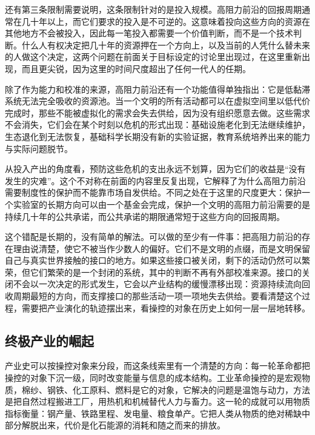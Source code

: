 还有第三条限制需要说明，这条限制针对的是投入规模。高阻力前沿的回报周期通常在几十年以上，而它们要求的投入是不可逆的。这意味着投向这些方向的资源在其他地方不会被投入，因此每一笔投入都需要一个价值判断，而不是一个技术判断。什么人有权决定把几十年的资源押在一个方向上，以及当前的人凭什么替未来的人做这个决定，这两个问题在前面关于目标设定的讨论里出现过，在这里重新出现，而且更尖锐，因为这里的时间尺度超出了任何一代人的任期。


除了作为能力和校准的来源，高阻力前沿还有一个功能值得单独指出：它是低黏滞系统无法完全吸收的资源池。当一个文明的所有活动都可以在虚拟空间里以低代价完成时，那些不能被虚拟化的需求会失去供给，因为没有组织愿意去做。这些需求不会消失，它们会在某个时刻以危机的形式出现：基础设施老化到无法继续维护，生态退化到无法恢复，基础科学长期没有新的实验证据，教育系统培养出来的能力与实际问题脱节。

从投入产出的角度看，预防这些危机的支出永远不划算，因为它们的收益是“没有发生的灾难”。这个不对称在前面的内容里反复出现，它解释了为什么高阻力前沿需要制度性的保护而不能靠市场自发供给。不同之处在于这里的尺度更大：保护一个实验室的长期方向可以由一个基金会完成，保护一个文明的高阻力前沿需要的是持续几十年的公共承诺，而公共承诺的期限通常短于这些方向的回报周期。

这个错配是长期的，没有简单的解法。可以做的至少有一件事：把高阻力前沿的存在理由说清楚，使它不被当作少数人的偏好。它们不是文明的点缀，而是文明保留自己与真实世界接触的接口的地方。如果这些接口被关闭，剩下的活动仍然可以繁荣，但它们繁荣的是一个封闭的系统，其中的判断不再有外部校准来源。接口的关闭不会以一次决定的形式发生，它会以产业结构的缓慢漂移出现：资源持续流向回收周期最短的方向，而支撑接口的那些活动一项一项地失去供给。要看清楚这个过程，需要把产业演化的轨迹摆出来，看操控的对象在历史上如何一层一层地转移。

\subsection{终极产业的崛起}


产业史可以按操控对象来分段，而这条线索里有一个清楚的方向：每一轮革命都把操控的对象下沉一级，同时改变能量与信息的成本结构。工业革命操控的是宏观物质，棉纱、钢铁、化工原料、燃料是它的对象，它解决的问题是温饱与动力，方法是把自然过程搬进工厂，用热机和机械替代人力与畜力。这一轮的成就可以用物质指标衡量：钢产量、铁路里程、发电量、粮食单产。它把人类从物质的绝对稀缺中部分解脱出来，代价是化石能源的消耗和随之而来的排放。

